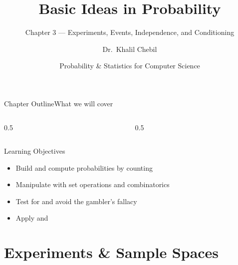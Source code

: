 \documentclass[aspectratio=169,11pt]{beamer}
\title[Ch.\,3 — Probability Basics]{Basic Ideas in Probability}
\subtitle{Chapter 3 — Experiments, Events, Independence, and Conditioning}
\author{Dr.\ Khalil Chebil}
\date{Probability \& Statistics for Computer Science}
\begin{document}
{
\begin{frame}
  \titlepage
\end{frame}}

\begin{frame}{Chapter Outline}{What we will cover}
  \begin{columns}[T]
    \begin{column}{0.5\textwidth}
      \tableofcontents[sections={1-3}]
    \end{column}
    \begin{column}{0.5\textwidth}
      \tableofcontents[sections={4-6}]
    \end{column}
  \end{columns}
  \vfill
  \begin{block}{Learning Objectives}
    \begin{itemize}
      \item Build  and compute probabilities by counting
      \item Manipulate  with set operations and combinatorics
      \item Test for  and avoid the gambler's fallacy
      \item Apply  and 
    \end{itemize}
  \end{block}
\end{frame}

\section{Experiments \& Sample Spaces}
\end{document}
